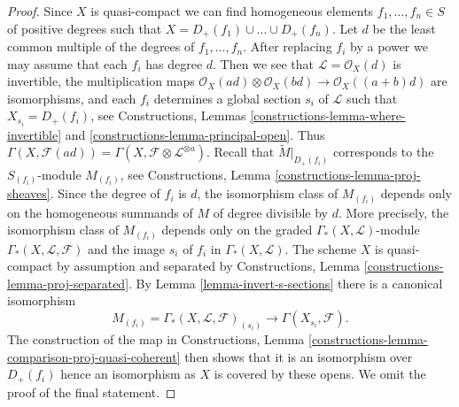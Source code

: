 \begin{proof}
Since $X$ is quasi-compact we can find homogeneous elements
$f_1, \ldots, f_n \in S$ of positive degrees such that
$X = D_+(f_1) \cup \ldots \cup D_+(f_n)$. Let $d$ be the
least common multiple of the degrees of $f_1, \ldots, f_n$.
After replacing $f_i$ by a power we may assume that each
$f_i$ has degree $d$. Then we see that $\mathcal{L} = \mathcal{O}_X(d)$ is
invertible, the multiplication maps
$\mathcal{O}_X(ad) \otimes \mathcal{O}_X(bd) \to \mathcal{O}_X((a + b)d)$
are isomorphisms, and each $f_i$ determines a global section $s_i$
of $\mathcal{L}$ such that $X_{s_i} = D_+(f_i)$, see
Constructions, Lemmas \ref{constructions-lemma-where-invertible} and
\ref{constructions-lemma-principal-open}.
Thus $\Gamma(X, \mathcal{F}(ad)) =
\Gamma(X, \mathcal{F} \otimes \mathcal{L}^{\otimes a})$.
Recall that $\widetilde{M}|_{D_{+}(f_i)}$ corresponds to the
$S_{(f_i)}$-module $M_{(f_i)}$, see
Constructions, Lemma \ref{constructions-lemma-proj-sheaves}.
Since the degree of $f_i$ is $d$, the isomorphism class of
$M_{(f_i)}$ depends only on the homogeneous summands of $M$ of
degree divisible by $d$. More precisely, the isomorphism class of
$M_{(f_i)}$ depends only on the graded $\Gamma_*(X, \mathcal{L})$-module
$\Gamma_*(X, \mathcal{L}, \mathcal{F})$
and the image $s_i$ of $f_i$ in $\Gamma_*(X, \mathcal{L})$.
The scheme $X$ is quasi-compact by assumption and
separated by Constructions, Lemma \ref{constructions-lemma-proj-separated}.
By Lemma \ref{lemma-invert-s-sections} there is a canonical isomorphism
$$
M_{(f_i)} = \Gamma_*(X, \mathcal{L}, \mathcal{F})_{(s_i)} \to
\Gamma(X_{s_i}, \mathcal{F}).
$$
The construction of the map in Constructions, Lemma
\ref{constructions-lemma-comparison-proj-quasi-coherent}
then shows that it is an isomorphism over $D_+(f_i)$
hence an isomorphism as $X$ is covered by these opens.
We omit the proof of the final statement.
\end{proof}




